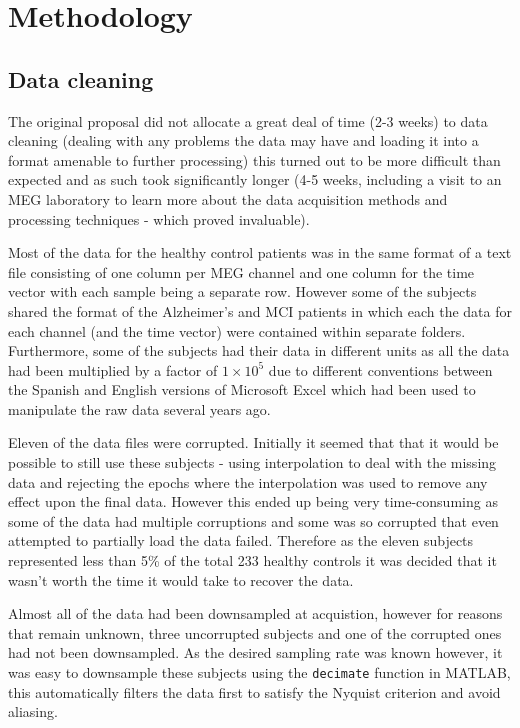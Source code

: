 \chapter{Methodology}

\section{Data cleaning}

The original proposal did not allocate a great deal of time (2-3 weeks) to data cleaning (dealing with any problems the data may have and loading it into a format amenable to further processing) this turned out to be more difficult than expected and as such took significantly longer (4-5 weeks, including a visit to an MEG laboratory to learn more about the data acquisition methods and processing techniques - which proved invaluable).

Most of the data for the healthy control patients was in the same format of a text file consisting of one column per MEG channel and one column for the time vector with each sample being a separate row. However some of the subjects shared the format of the Alzheimer's and MCI patients in which each the data for each channel (and the time vector) were contained within separate folders. Furthermore, some of the subjects had their data in different units as all the data had been multiplied by a factor of $1\times10^{5}$ due to different conventions between the Spanish and English versions of Microsoft Excel which had been used to manipulate the raw data several years ago.

Eleven of the data files were corrupted. Initially it seemed that that it would be possible to still use these subjects - using interpolation to deal with the missing data and rejecting the epochs where the interpolation was used to remove any effect upon the final data. However this ended up being very time-consuming as some of the data had multiple corruptions and some was so corrupted that even attempted to partially load the data failed. Therefore as the eleven subjects represented less than 5\% of the total 233 healthy controls it was decided that it wasn't worth the time it would take to recover the data.

Almost all of the data had been downsampled at acquistion, however for reasons that remain unknown, three uncorrupted subjects and one of the corrupted ones had not been downsampled. As the desired sampling rate was known however, it was easy to downsample these subjects using the \texttt{decimate} function in MATLAB, this automatically filters the data first to satisfy the Nyquist criterion and avoid aliasing.

